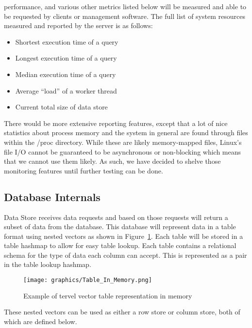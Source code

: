 \documentclass[letterpaper, 12pt]{article}
\begin{document}
performance, and various other metrics listed below will be measured and able to be
requested by clients or management software. The full list of system resources measured
and reported by the server is as follows:
\begin{itemize}
 \item Shortest execution time of a query
 \item Longest execution time of a query
 \item Median execution time of a query
 \item Average ``load'' of a worker thread
 \item Current total size of data store
\end{itemize}

There would be more extensive reporting features, except that a lot of 
nice statistics about process memory and the system in general are found through files within the /proc
directory. While these are likely memory-mapped files, Linux's file I/O cannot be guaranteed to be
asynchronous or non-blocking which means that we cannot use them likely. As such, we have decided
to shelve those monitoring features until further testing can be done.
\par\vspace{\baselineskip}

\subsection{Database Internals}
Data Store receives data requests and based on those requests will return a subset of data from
the database. This database will represent data in a table format using nested vectors as shown
in Figure~\ref{fig:tables_in_memory}. Each table will be stored in a table hashmap to allow for 
easy table lookup. Each table contains a relational schema for the type of data each column 
can accept. This is represented as a pair in the table lookup hashmap.
\par\vspace{\baselineskip}

\begin{figure}
  \centering
  \texttt{[image: graphics/Table\_In\_Memory.png]}
  \caption{Example of tervel vector table representation in memory}
  \label{fig:tables_in_memory}
\end{figure}

These nested vectors can be used as either a row store or column store, both of which are defined below.
\par\vspace{\baselineskip}
\end{document}
